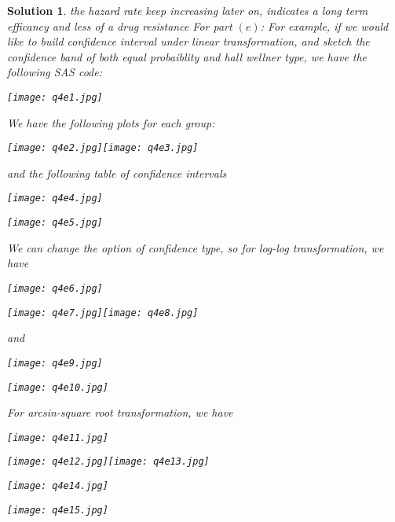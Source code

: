 \documentclass[11pt]{article}
\newtheorem{sol}{Solution}
\begin{document}
\begin{sol}
	the hazard rate keep increasing later on, indicates a long term efficancy and less of a drug resistance\vskip 2mm
	For part $(e)$:\vskip 2mm
	For example, if we would like to build confidence interval under linear transformation, and sketch the confidence band of both equal probaiblity and hall wellner type, we have the following SAS code:
	\begin{center}
		\texttt{[image: q4e1.jpg]}
	\end{center}
	We have the following plots for each group:
	\begin{center}
		\texttt{[image: q4e2.jpg]}\texttt{[image: q4e3.jpg]}
	\end{center}
	and the following table of confidence intervals
	\begin{center}
		\texttt{[image: q4e4.jpg]}
	\end{center}
	\begin{center}
		\texttt{[image: q4e5.jpg]}
	\end{center}
	We can change the option of confidence type, so for log-log transformation, we have
	\begin{center}
		\texttt{[image: q4e6.jpg]}
	\end{center}
	\begin{center}
		\texttt{[image: q4e7.jpg]}\texttt{[image: q4e8.jpg]}
	\end{center}
	and
	\begin{center}
		\texttt{[image: q4e9.jpg]}
	\end{center}
	\begin{center}
		\texttt{[image: q4e10.jpg]}
	\end{center}
	For arcsin-square root transformation, we have 
	\begin{center}
		\texttt{[image: q4e11.jpg]}
	\end{center}
	\begin{center}
		\texttt{[image: q4e12.jpg]}\texttt{[image: q4e13.jpg]}
	\end{center}
	\begin{center}
		\texttt{[image: q4e14.jpg]}
	\end{center}
	\begin{center}
		\texttt{[image: q4e15.jpg]}
	\end{center}
\end{sol}
\end{document}
